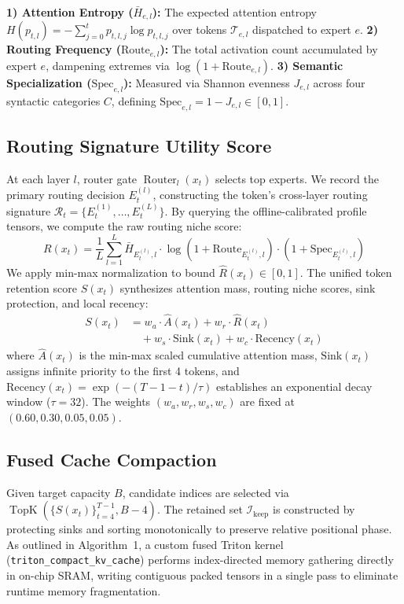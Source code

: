 \documentclass[conference]{IEEEtran}
\begin{document}
\textbf{1) Attention Entropy ($\bar{H}_{e,l}$):} The expected attention entropy $H(p_{t,l}) = -\sum_{j=0}^{t} p_{t,l,j} \log p_{t,l,j}$ over tokens $\mathcal{T}_{e,l}$ dispatched to expert $e$.
\textbf{2) Routing Frequency ($\text{Route}_{e,l}$):} The total activation count accumulated by expert $e$, dampening extremes via $\log(1 + \text{Route}_{e,l})$.
\textbf{3) Semantic Specialization ($\text{Spec}_{e,l}$):} Measured via Shannon evenness $J_{e,l}$ across four syntactic categories $C$, defining $\text{Spec}_{e,l} = 1 - J_{e,l} \in [0, 1]$.

\subsection{Routing Signature Utility Score}
At each layer $l$, router gate $\operatorname{Router}_l(x_t)$ selects top experts. We record the primary routing decision $E_t^{(l)}$, constructing the token's cross-layer routing signature $\mathcal{R}_t = \{ E_t^{(1)}, \dots, E_t^{(L)} \}$. By querying the offline-calibrated profile tensors, we compute the raw routing niche score:
\begin{equation}
    R(x_t) = \frac{1}{L}\sum_{l=1}^{L} \bar{H}_{E_t^{(l)}, l} \cdot \log(1 + \text{Route}_{E_t^{(l)}, l}) \cdot (1 + \text{Spec}_{E_t^{(l)}, l})
    \label{eq:routing_score}
\end{equation}
We apply min-max normalization to bound $\hat{R}(x_t) \in [0, 1]$. The unified token retention score $S(x_t)$ synthesizes attention mass, routing niche scores, sink protection, and local recency:
\begin{align}
    S(x_t) &= w_a \cdot \hat{A}(x_t) + w_r \cdot \hat{R}(x_t) \nonumber \\
           &\quad + w_s \cdot \text{Sink}(x_t) + w_c \cdot \text{Recency}(x_t)
    \label{eq:saliency}
\end{align}
where $\hat{A}(x_t)$ is the min-max scaled cumulative attention mass, $\text{Sink}(x_t)$ assigns infinite priority to the first 4 tokens, and $\text{Recency}(x_t) = \exp(-(T - 1 - t)/\tau)$ establishes an exponential decay window ($\tau = 32$). The weights $(w_a, w_r, w_s, w_c)$ are fixed at $(0.60, 0.30, 0.05, 0.05)$.

\subsection{Fused Cache Compaction}
Given target capacity $B$, candidate indices are selected via $\operatorname{TopK}\left( \{S(x_t)\}_{t=4}^{T-1}, B - 4 \right)$. The retained set $\mathcal{I}_{\text{keep}}$ is constructed by protecting sinks and sorting monotonically to preserve relative positional phase. As outlined in Algorithm~1, a custom fused Triton kernel (\texttt{triton\_compact\_kv\_cache}) performs index-directed memory gathering directly in on-chip SRAM, writing contiguous packed tensors in a single pass to eliminate runtime memory fragmentation.
\end{document}
